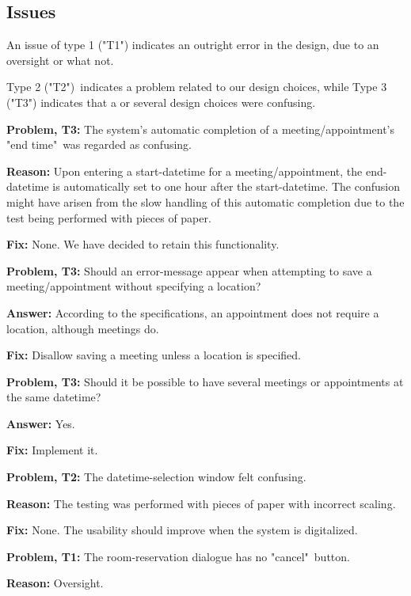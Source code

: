 \documentclass{article}
\begin{document}
\subsection{Issues}

An issue of type 1 ("T1") indicates an outright error in the design, due to
an oversight or what not.

Type 2 ("T2")\ indicates a problem related to our design choices, while Type
3 ("T3") indicates that a or several design choices were confusing.

\bigskip

\textbf{Problem, T3:} The system's automatic completion of a
meeting/appointment's "end time"\ was regarded as confusing.

\textbf{Reason:} Upon entering a start-datetime for a meeting/appointment,
the end-datetime is automatically set to one hour after the start-datetime.
The confusion might have arisen from the slow handling of this automatic
completion due to the test being performed with pieces of paper.

\textbf{Fix:} None. We have decided to retain this functionality.

\bigskip

\textbf{Problem, T3: }Should an error-message appear when attempting to save
a meeting/appointment without specifying a location?

\textbf{Answer:} According to the specifications, an appointment does not
require a location, although meetings do.

\textbf{Fix:} Disallow saving a meeting unless a location is specified.

\bigskip

\textbf{Problem, T3:} Should it be possible to have several meetings or
appointments at the same datetime?

\textbf{Answer:} Yes.

\textbf{Fix:} Implement it.

\bigskip

\textbf{Problem, T2: }The datetime-selection window felt confusing.

\textbf{Reason:} The testing was performed with pieces of paper with
incorrect scaling.

\textbf{Fix:} None. The usability should improve when the system is
digitalized.

\bigskip

\textbf{Problem, T1:} The room-reservation dialogue has no "cancel"\ button.

\textbf{Reason:} Oversight.
\end{document}
